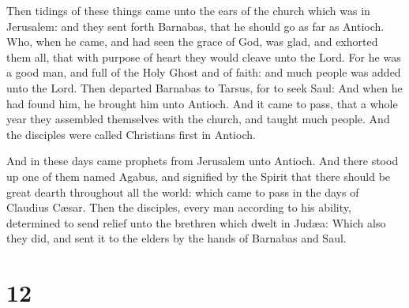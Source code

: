  Then tidings of these things came unto the ears of the
church which was in Jerusalem: and they sent forth Barnabas, that he
should go as far as Antioch.  Who, when he came, and had
seen the grace of God, was glad, and exhorted them all, that with
purpose of heart they would cleave unto the Lord.  For he
was a good man, and full of the Holy Ghost and of faith: and much people
was added unto the Lord.  Then departed Barnabas to
Tarsus, for to seek Saul:  And when he had found him, he
brought him unto Antioch. And it came to pass, that a whole year they
assembled themselves with the church, and taught much people. And the
disciples were called Christians first in Antioch.

 And in these days came prophets from Jerusalem unto
Antioch.  And there stood up one of them named Agabus,
and signified by the Spirit that there should be great dearth throughout
all the world: which came to pass in the days of Claudius Cæsar.
 Then the disciples, every man according to his ability,
determined to send relief unto the brethren which dwelt in Judæa:
 Which also they did, and sent it to the elders by the
hands of Barnabas and Saul.

\hypertarget{section-11}{%
\section{12}\label{section-11}}

